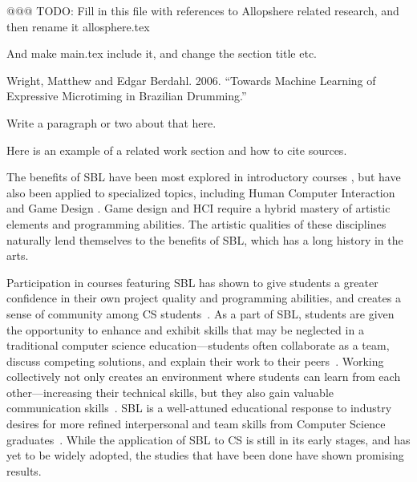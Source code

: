@@@ TODO: Fill in this file with references to Allopshere related research,
and then rename it allosphere.tex

And make main.tex include it, and change the section title etc.

Wright, Matthew and Edgar Berdahl. 2006. “Towards Machine Learning of Expressive Microtiming in Brazilian Drumming.” \cite{Wright2006BrazDrumML}

Write a paragraph or two about that here.





Here is an example of a related work section and how to cite sources.

The benefits of SBL have been most explored in introductory
courses \cite{p55-gestwicki, p505-hendrix, p165-narayanan}, but have
also been applied to specialized topics, including Human Computer
Interaction \cite{p117-hundhausen} and Game Design
\cite{p64-estey}. Game design and HCI require a hybrid mastery of
artistic elements and programming abilities. The artistic qualities of
these disciplines naturally lend themselves to the benefits of SBL,
which has a long history in the arts.

Participation in courses featuring SBL has shown to give students a
greater confidence in their own project quality and programming
abilities, and creates a sense of community among CS
students~\cite{p887-bergin, p64-estey}. As a part of SBL, students are
given the opportunity to enhance and exhibit skills that may be
neglected in a traditional computer science education---students often
collaborate as a team, discuss competing solutions, and explain their
work to their peers~\cite{p505-hendrix}.  Working collectively not
only creates an environment where students can learn from each
other---increasing their technical skills, but they also gain valuable
communication skills~\cite{p165-narayanan}. SBL is a well-attuned
educational response to industry desires for more refined
interpersonal and team skills from Computer Science
graduates~\cite{p64-estey}.  While the application of SBL to CS is
still in its early stages, and has yet to be widely adopted, the
studies that have been done have shown promising results.


